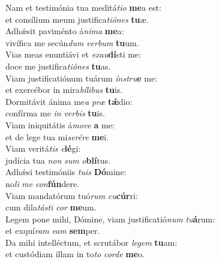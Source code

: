 \evenverse Nam et testimónia tua meditá\textit{ti}\textit{o} \textbf{me}a est:~\*\\
\evenverse et consílium meum justifica\textit{ti}\textit{ó}\textit{nes} \textbf{tu}æ.\\
\oddverse Adhǽsit paviménto á\textit{ni}\textit{ma} \textbf{me}a:~\*\\
\oddverse vivífica me secún\textit{dum} \textit{ver}\textit{bum} \textbf{tu}um.\\
\evenverse Vias meas enuntiávi et \textit{e}\textit{xau}\textbf{dí}sti me:~\*\\
\evenverse doce me justifica\textit{ti}\textit{ó}\textit{nes} \textbf{tu}as.\\
\oddverse Viam justificatiónum tuárum \textit{ín}\textit{stru}\textbf{e} me:~\*\\
\oddverse et exercébor in mira\textit{bí}\textit{li}\textit{bus} \textbf{tu}is.\\
\evenverse Dormitávit ánima me\textit{a} \textit{præ} \textbf{tǽ}dio:~\*\\
\evenverse confírma me \textit{in} \textit{ver}\textit{bis} \textbf{tu}is.\\
\oddverse Viam iniquitátis á\textit{mo}\textit{ve} \textbf{a} me:~\*\\
\oddverse et de lege tua mi\textit{se}\textit{ré}\textit{re} \textbf{me}i.\\
\evenverse Viam veritá\textit{tis} \textit{e}\textbf{lé}gi:~\*\\
\evenverse judícia tua \textit{non} \textit{sum} \textit{o}\textbf{blí}tus.\\
\oddverse Adhǽsi testimóniis \textit{tu}\textit{is} \textbf{Dó}mine:~\*\\
\oddverse no\textit{li} \textit{me} \textit{con}\textbf{fún}dere.\\
\evenverse Viam mandatórum tuó\textit{rum} \textit{cu}\textbf{cúr}ri:~\*\\
\evenverse cum dila\textit{tá}\textit{sti} \textit{cor} \textbf{me}um.\\
\oddverse Legem pone mihi, Dómine, viam justificatió\textit{num} \textit{tu}\textbf{á}rum:~\*\\
\oddverse et exquí\textit{ram} \textit{e}\textit{am} \textbf{sem}per.\\
\evenverse Da mihi intelléctum, et scrutábor \textit{le}\textit{gem} \textbf{tu}am:~\*\\
\evenverse et custódiam illam in to\textit{to} \textit{cor}\textit{de} \textbf{me}o.\\
